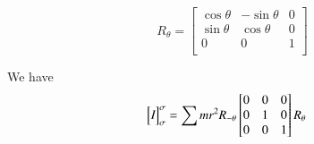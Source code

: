 \documentclass{article}      %
\newcommand{\matrixoftx}[3]{
{
\begin{bmatrix}
{#1}
\end{bmatrix}
}_{#2}^{#3}
}
\begin{document}
\[
R_\theta =
\begin{bmatrix}
\cos\theta & -\sin\theta & 0 \\
\sin\theta & \cos\theta & 0 \\
0 & 0 & 1 \\
\end{bmatrix}
\]

We have
\begin{align*}
\matrixoftx{\emph{I}}{\sigma}{\sigma}
&=
\sum 
m r^2
R_{-\theta}
\begin{bmatrix}
0 & 0 & 0 \\
0 & 1 & 0 \\
0 & 0 & 1 \\
\end{bmatrix}
R_\theta
\end{align*}
\end{document}
